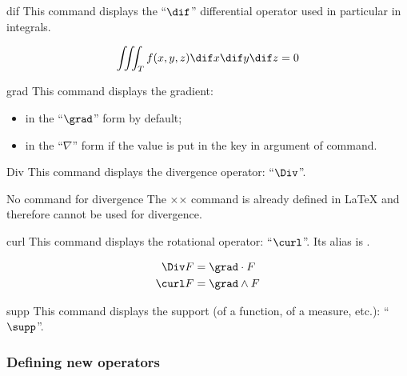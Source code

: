 \documentclass[english,nolocaltoc]{nwejmart}
\newtheorem[style=definition]{fact}
\newtheorem[title-plural=Criteria]{criterion}
\newtheorem[title=random experiment]{rexp}
\begin{document}
\begin{docCommand}{dif}{}
  This command displays the \enquote{$\dif$} differential operator used in particular in
  integrals.
\begin{bodycode}
\begin{equation}
\iiint_T f(x,y,z)\dif x \dif y \dif z=0
\end{equation}
\end{bodycode}
\end{docCommand}

\begin{docCommand}{grad}{}
  This command displays the gradient:
  \begin{itemize}
  \item in the \enquote{$\grad$} form by default;
  \item in the \enquote{$\nabla$} form if the  value
    is put in the  key  in  argument of  command.
  \end{itemize}
\end{docCommand}

\begin{docCommand}{Div}{}
   This command displays the divergence operator: \enquote{$\Div$}.
  \begin{dbremark}{No command \protect{} for divergence}{}
    The ×\div× command is already defined in \LaTeX{} and therefore
    cannot be used for divergence.
  \end{dbremark}
\end{docCommand}

\begin{docCommand}{curl}{}
 This command displays the  rotational operator:
 \enquote{$\curl$}. Its alias is .
\end{docCommand}

\begin{bodycode}
\begin{align}
  \Div  F & = \grad \cdot  F \\
  \curl F & = \grad \wedge F
\end{align}
\end{bodycode}

\begin{docCommand}{supp}{}
  This command displays the support (of a function, of a measure, etc.):
  \enquote{$\supp$}.
\end{docCommand}

\subsubsection{Defining new operators}
\end{document}
